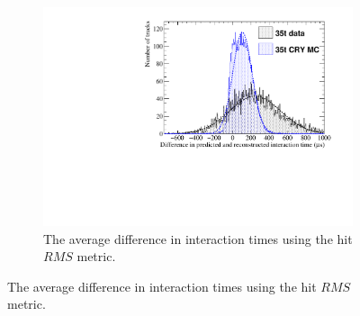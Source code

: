 \begin{figure}
  \centering
  \begin{subfigure}{0.6\textwidth}
    \centering
    \includegraphics[width=\textwidth]{Overlay_AvTimeDiff_RMS}
    \caption{The average difference in interaction times using the hit $RMS$ metric.}
    \label{fig:DiffOverlayAvDiff_RMS_T}
  \end{subfigure}


\end{figure}
